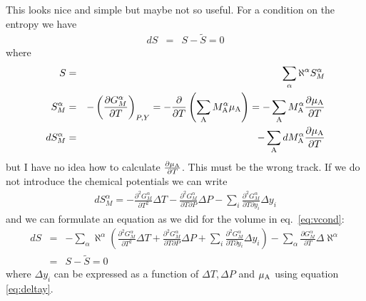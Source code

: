 \documentclass[12pt]{article}
\begin{document}
This looks nice and simple but maybe not so useful.  For a condition
on the entropy we have
\begin{eqnarray}
dS &=& S-\tilde S = 0
\end{eqnarray}
where
\begin{eqnarray}
S &=& \sum_{\alpha} \aleph^{\alpha} S_M^{\alpha}\\
S^{\alpha}_M &=& -\left(\frac{\partial G^{\alpha}_M}{\partial T}\right)_{P,Y} = 
-\frac{\partial }{\partial T}\left(\sum_{\rm A} M^{\alpha}_{\rm A} \mu_{\rm A}\right)=
-\sum_{\rm A} M^{\alpha}_{\rm A} \frac{\partial \mu_{\rm A}}{\partial T}\\
dS^{\alpha}_M &=& -\sum_{\rm A} dM^{\alpha}_{\rm A} \frac{\partial \mu_{\rm A}}{\partial T}
\end{eqnarray}
but I have no idea how to calculate $\frac{\partial \mu_{\rm A}}{\partial T}$.
This must be the wrong track.  If we do not introduce the chemical
potentials we can write
\begin{eqnarray}
dS_M^{\alpha} = -\frac{\partial^2 G^{\alpha}_M}{\partial T^2}\Delta T-
\frac{\partial^2 G^{\alpha}_M}{\partial T\partial P}\Delta P-
\sum_i\frac{\partial^2 G^{\alpha}_M}{\partial T\partial y_i}\Delta y_i
\end{eqnarray}
and we can formulate an equation as we did for the volume in
eq.~\ref{eq:vcond}:
\begin{eqnarray}
dS &=& -\sum_{\alpha} \aleph^{\alpha} \left(\frac{\partial^2 G^{\alpha}_M}{\partial T^2} \Delta T + 
\frac{\partial^2 G^{\alpha}_M}{\partial T\partial P} \Delta P + 
\sum_i\frac{\partial^2 G^{\alpha}_M}{\partial T\partial y_{i}} \Delta y_i\right) -
\sum_{\alpha} \frac{\partial G^{\alpha}_M}{\partial T} \Delta\aleph^{\alpha}
\nonumber\\&=& S - \tilde S = 0\label{eq:scond}
\end{eqnarray}
where $\Delta y_i$ can be expressed as a function of $\Delta T, \Delta
P$ and $\mu_{\rm A}$ using equation \ref{eq:deltay}.
\end{document}
